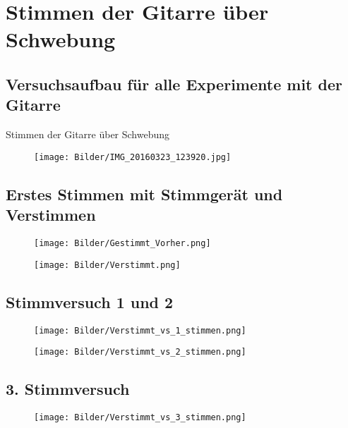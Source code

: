 \documentclass[11pt]{beamer}
\begin{document}
\section{Stimmen der Gitarre über Schwebung}
\subsection{Versuchsaufbau für alle Experimente mit der Gitarre}
\begin{frame}{Stimmen der Gitarre über Schwebung}
\begin{figure}[H]
\centering
\texttt{[image: Bilder/IMG\_20160323\_123920.jpg]}
\end{figure}
\end{frame}

\subsection{Erstes Stimmen mit Stimmgerät und Verstimmen}
\begin{frame}
\begin{figure}[H]
\centering
\texttt{[image: Bilder/Gestimmt\_Vorher.png]}
\end{figure}
\begin{figure}[H]
\centering
\texttt{[image: Bilder/Verstimmt.png]}
\end{figure}
\end{frame}

\subsection{Stimmversuch 1 und 2}
\begin{frame}
\begin{figure}[H]
\centering
\texttt{[image: Bilder/Verstimmt\_vs\_1\_stimmen.png]}
\end{figure}
\begin{figure}[H]
\centering
\texttt{[image: Bilder/Verstimmt\_vs\_2\_stimmen.png]}
\end{figure}
\end{frame}

\subsection{3. Stimmversuch}
\begin{frame}
\begin{figure}[H]
\centering
\texttt{[image: Bilder/Verstimmt\_vs\_3\_stimmen.png]}
\end{figure}
\end{frame}
\end{document}
